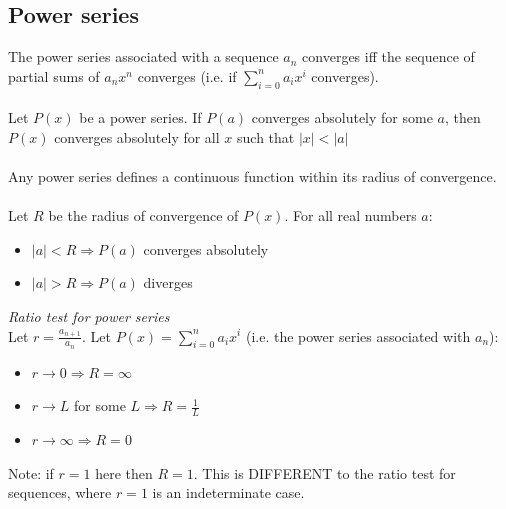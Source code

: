 \documentclass{scrartcl}
\begin{document}
\subsection{Power series}
The power series associated with a sequence $ a_{n} $ converges iff the sequence of partial sums  of $ a_{n}x^{n} $ converges (i.e. if $ \sum_{i = 0}^{n} a_{i}x^{i} $ converges).
\\\\
Let $ P(x) $ be a power series. If $ P(a) $ converges absolutely for some $ a $, then $ P(x) $ converges absolutely for all $ x $ such that $ |x| < |a| $
\\\\
Any power series defines a continuous function within its radius of convergence.
\\\\
Let $ R $ be the radius of convergence of $ P(x) $. For all real numbers $ a $:
\begin{itemize}
\item $ |a| < R \Rightarrow P(a) $ converges absolutely
\item $ |a| > R \Rightarrow P(a) $ diverges
\end{itemize}
\textit{Ratio test for power series}
\\
Let $ r = \frac{a_{n + 1}}{a_{n}} $. Let $ P(x) = \sum_{i = 0}^{n} a_{i}x^{i} $ (i.e. the power series associated with $ a_{n} $):
\begin{itemize}
\item $ r \to 0 \Rightarrow R = \infty $
\item $ r \to L $ for some $ L \Rightarrow R = \frac{1}{L} $
\item $ r \to \infty \Rightarrow R = 0 $
\end{itemize}
Note: if $ r = 1 $ here then $ R = 1 $. This is DIFFERENT to the ratio test for sequences, where $ r = 1 $ is an indeterminate case.
\end{document}
